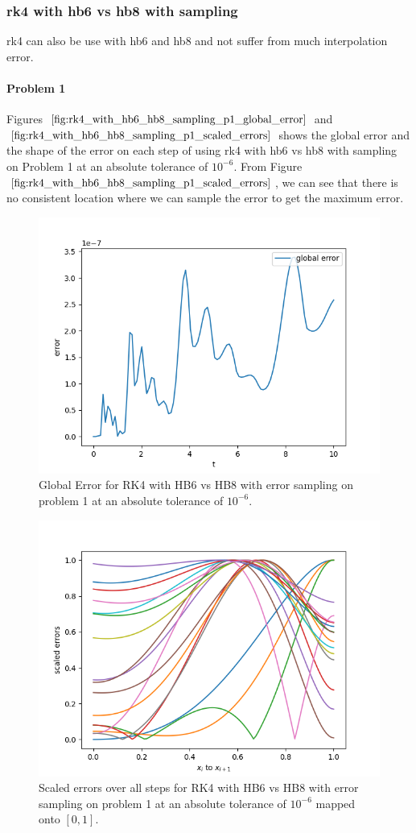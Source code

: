 \subsubsection{rk4 with hb6 vs hb8 with sampling}
rk4 can also be use with hb6  and hb8 and not suffer from much interpolation error.

\paragraph{Problem 1} Figures $\ref{fig:rk4_with_hb6_hb8_sampling_p1_global_error}$ and $\ref{fig:rk4_with_hb6_hb8_sampling_p1_scaled_errors}$ shows the global error and the shape of the error on each step of using rk4 with hb6 vs hb8 with sampling on Problem 1 at an absolute tolerance of $10^{-6}$. From Figure $\ref{fig:rk4_with_hb6_hb8_sampling_p1_scaled_errors}$, we can see that there is no consistent location where we can sample the error to get the maximum error.

\begin{figure}[H]
\centering
\includegraphics[width=0.7\linewidth]{./figures/rk4_with_hb6_hb8_sampling_p1_global_error}
\caption{Global Error for RK4 with HB6 vs HB8 with error sampling on problem 1 at an absolute tolerance of $10^{-6}$.}
\label{fig:rk4_with_hb6_hb8_sampling_p1_global_error}
\end{figure}

\begin{figure}[H]
\centering
\includegraphics[width=0.7\linewidth]{./figures/rk4_with_hb6_hb8_sampling_p1_scaled_errors}
\caption{Scaled errors over all steps for RK4 with HB6 vs HB8 with error sampling on problem 1 at an absolute tolerance of $10^{-6}$ mapped onto $[0, 1]$.}
\label{fig:rk4_with_hb6_hb8_sampling_p1_scaled_errors}
\end{figure}

